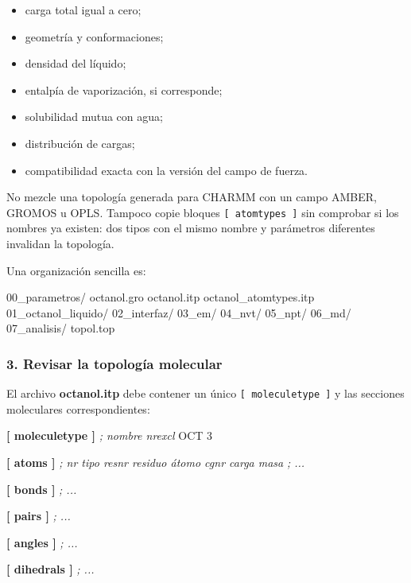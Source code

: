\documentclass[
  spanish,
  11pt,
  a4paper]{article}
\newenvironment{Shaded}{\begin{snugshade}}{\end{snugshade}}
\newcommand{\CommentTok}[1]{\textcolor[rgb]{0.56,0.35,0.01}{\textit{#1}}}
\newcommand{\DataTypeTok}[1]{\textcolor[rgb]{0.13,0.29,0.53}{#1}}
\newcommand{\KeywordTok}[1]{\textcolor[rgb]{0.13,0.29,0.53}{\textbf{#1}}}
\newcommand{\NormalTok}[1]{#1}
\providecommand{\tightlist}{%
  \setlength{\itemsep}{0pt}\setlength{\parskip}{0pt}}
\begin{document}
\begin{itemize}
\tightlist
\item
  carga total igual a cero;
\item
  geometría y conformaciones;
\item
  densidad del líquido;
\item
  entalpía de vaporización, si corresponde;
\item
  solubilidad mutua con agua;
\item
  distribución de cargas;
\item
  compatibilidad exacta con la versión del campo de fuerza.
\end{itemize}

No mezcle una topología generada para CHARMM con un campo AMBER, GROMOS
u OPLS. Tampoco copie bloques \texttt{{[}\ atomtypes\ {]}} sin comprobar
si los nombres ya existen: dos tipos con el mismo nombre y parámetros
diferentes invalidan la topología.

Una organización sencilla es:

\begin{Shaded}
\begin{Highlighting}[]
\NormalTok{00\_parametros/}
\NormalTok{    octanol.gro}
\NormalTok{    octanol.itp}
\NormalTok{    octanol\_atomtypes.itp}
\NormalTok{01\_octanol\_liquido/}
\NormalTok{02\_interfaz/}
\NormalTok{03\_em/}
\NormalTok{04\_nvt/}
\NormalTok{05\_npt/}
\NormalTok{06\_md/}
\NormalTok{07\_analisis/}
\NormalTok{topol.top}
\end{Highlighting}
\end{Shaded}

\subsubsection{3. Revisar la topología
molecular}\label{revisar-la-topologuxeda-molecular}

El archivo \textbf{octanol.itp} debe contener un único
\texttt{{[}\ moleculetype\ {]}} y las secciones moleculares
correspondientes:

\begin{Shaded}
\begin{Highlighting}[]
\KeywordTok{[ moleculetype ]}
\CommentTok{; nombre    nrexcl}
\DataTypeTok{OCT         3}

\KeywordTok{[ atoms ]}
\CommentTok{; nr  tipo  resnr  residuo  átomo  cgnr  carga  masa}
\CommentTok{; ...}

\KeywordTok{[ bonds ]}
\CommentTok{; ...}

\KeywordTok{[ pairs ]}
\CommentTok{; ...}

\KeywordTok{[ angles ]}
\CommentTok{; ...}

\KeywordTok{[ dihedrals ]}
\CommentTok{; ...}
\end{Highlighting}
\end{Shaded}
\end{document}
